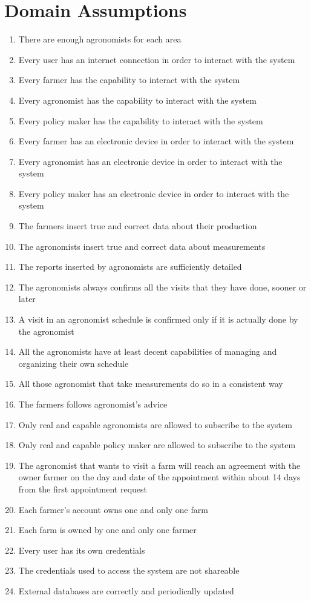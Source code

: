 \documentclass[10pt]{report}
\begin{document}
\section{Domain Assumptions}
    \begin{enumerate}[label=(D\arabic*), font=\itshape]
        \item There are enough agronomists for each area
        \item Every user has an internet connection in order to interact with the system
        \item Every farmer has the capability to interact with the system
        \item Every agronomist has the capability to interact with the system
        \item Every policy maker has the capability to interact with the system
        \item Every farmer has an electronic device in order to interact with the system
        \item Every agronomist has an electronic device in order to interact with the system
        \item Every policy maker has an electronic device in order to interact with the system
        \item The farmers insert true and correct data about their production
        \item The agronomists insert true and correct data about measurements
        \item The reports inserted by agronomists are sufficiently detailed
        \item The agronomists always confirms all the visits that they have done, sooner or later
        \item A visit in an agronomist schedule is confirmed only if it is actually done by the agronomist
        \item All the agronomists have at least decent capabilities of managing and organizing their own schedule
        \item All those agronomist that take measurements do so in a consistent way
        \item The farmers follows agronomist’s advice
        \item Only real and capable agronomists are allowed to subscribe to the system 
        \item Only real and capable policy maker are allowed to subscribe to the system 
        \item The agronomist that wants to visit a farm will reach an agreement with the owner farmer on the day and date of the appointment within about 14 days from the first appointment request
        \item Each farmer’s account owns one and only one farm
        \item Each farm is owned by one and only one farmer
        \item Every user has its own credentials
        \item The credentials used to access the system are not shareable
        \item External databases are correctly and periodically updated
    \end{enumerate}
\end{document}

